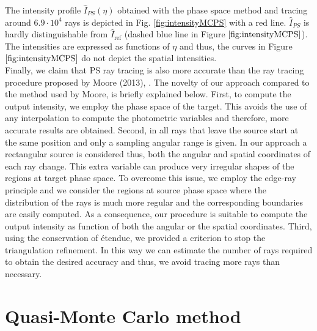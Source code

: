 \indent The intensity profile $\hat{I}_{PS}(\eta)$ obtained with the phase space method and tracing around $6.9\cdot 10^4$ rays is depicted in Fig. \ref{fig:intensityMCPS} with a red line.
$\hat{I}_{PS}$ is hardly distinguishable from $\hat{I}_{\mbox{ref}}$ (dashed blue line in Figure $\ref{fig:intensityMCPS}$). The intensities are expressed as functions of $\eta$ and thus, the curves in Figure $\ref{fig:intensityMCPS}$ do not depict the spatial intensities.\\
\indent Finally, we claim that PS ray tracing is also more accurate than the ray tracing procedure proposed by Moore (2013), \cite{moore2013methods}.
The novelty of our approach compared to the method used by Moore, is briefly explained below.
First, to compute the output intensity, we employ the phase space of the target. This avoids the use of any interpolation to compute the photometric variables and therefore, more accurate results are obtained.
Second, in \cite{moore2013methods} all rays that leave the source start at the same position and only a sampling angular range is given. In our approach a rectangular source is considered thus, both the angular and spatial coordinates of each ray change. This extra variable can produce very irregular shapes of the regions at target phase space. To overcome this issue, we employ the edge-ray principle and we consider the regions at source phase space where the distribution of the rays is much more regular and the corresponding boundaries are easily computed.
As a consequence, our procedure is suitable to compute the output intensity as function of both the angular or the spatial coordinates.
Third, using the conservation of \'{e}tendue, we provided a criterion to stop the triangulation refinement. In this way we can estimate the number of rays required to obtain the desired accuracy and thus, we avoid tracing more rays than necessary.
\section{Quasi-Monte Carlo method}
